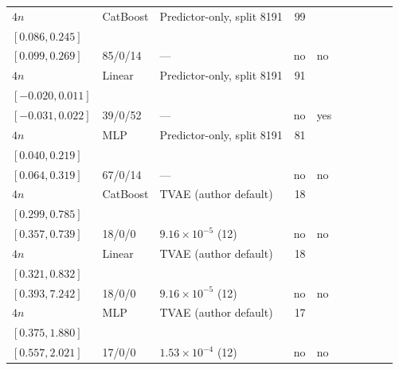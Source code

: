 \begin{longtable}{@{}ll>{\raggedright\arraybackslash}p{1.1in}rllrlll@{}}
$4n$ & CatBoost & Predictor-only, split 8191 & 99 & \begin{tabular}[t]{@{}l@{}}$0.172$\\\tiny$[0.086, 0.245]$\end{tabular} & \begin{tabular}[t]{@{}l@{}}$0.190$\\\tiny$[0.099, 0.269]$\end{tabular} & 85/0/14 & --- & no & no \\
$4n$ & Linear & Predictor-only, split 8191 & 91 & \begin{tabular}[t]{@{}l@{}}$-0.004$\\\tiny$[-0.020, 0.011]$\end{tabular} & \begin{tabular}[t]{@{}l@{}}$-0.004$\\\tiny$[-0.031, 0.022]$\end{tabular} & 39/0/52 & --- & no & yes \\
$4n$ & MLP & Predictor-only, split 8191 & 81 & \begin{tabular}[t]{@{}l@{}}$0.122$\\\tiny$[0.040, 0.219]$\end{tabular} & \begin{tabular}[t]{@{}l@{}}$0.178$\\\tiny$[0.064, 0.319]$\end{tabular} & 67/0/14 & --- & no & no \\
$4n$ & CatBoost & TVAE (author default) & 18 & \begin{tabular}[t]{@{}l@{}}$0.470$\\\tiny$[0.299, 0.785]$\end{tabular} & \begin{tabular}[t]{@{}l@{}}$0.505$\\\tiny$[0.357, 0.739]$\end{tabular} & 18/0/0 & $9.16\times 10^{-5}$ (12) & no & no \\
$4n$ & Linear & TVAE (author default) & 18 & \begin{tabular}[t]{@{}l@{}}$0.562$\\\tiny$[0.321, 0.832]$\end{tabular} & \begin{tabular}[t]{@{}l@{}}$0.575$\\\tiny$[0.393, 7.242]$\end{tabular} & 18/0/0 & $9.16\times 10^{-5}$ (12) & no & no \\
$4n$ & MLP & TVAE (author default) & 17 & \begin{tabular}[t]{@{}l@{}}$0.761$\\\tiny$[0.375, 1.880]$\end{tabular} & \begin{tabular}[t]{@{}l@{}}$0.932$\\\tiny$[0.557, 2.021]$\end{tabular} & 17/0/0 & $1.53\times 10^{-4}$ (12) & no & no \\
\bottomrule
\end{longtable}
